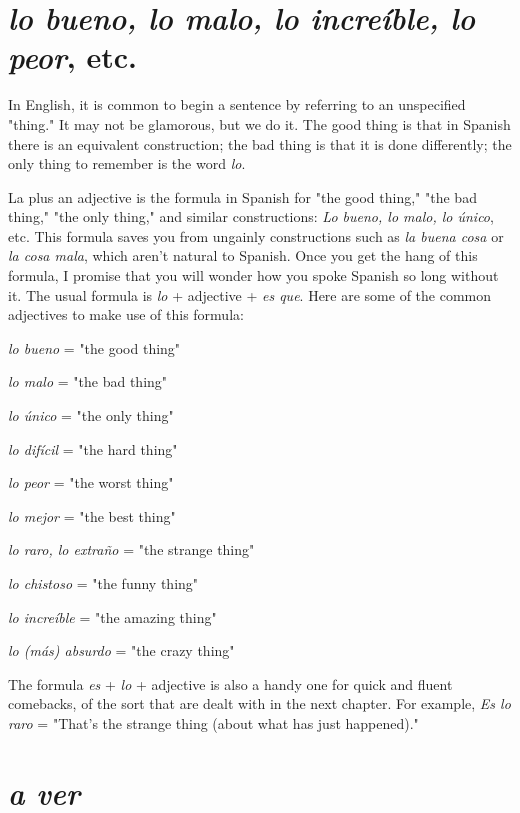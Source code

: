 \section{\emph{lo bueno, lo malo, lo increíble, lo peor}, etc.}

In English, it is common to begin a sentence by referring to an
unspecified "thing." It may not be glamorous, but we do it. The good
thing is that in Spanish there is an equivalent construction; the bad
thing is that it is done differently; the only thing to remember is the
word \emph{lo}.

La plus an adjective is the formula in Spanish for "the good
thing," "the bad thing," "the only thing," and similar constructions:
\emph{Lo bueno, lo malo, lo único}, etc. This formula saves you from ungainly constructions such as \emph{la buena cosa} or \emph{la cosa mala}, which
aren't natural to Spanish. Once you get the hang of this formula, I
promise that you will wonder how you spoke Spanish so long without
it. The usual formula is \emph{lo} + adjective + \emph{es que}. Here are some of the
common adjectives to make use of this formula:

\bsk

\indu \emph{lo bueno} = "the good thing"

\indu \emph{lo malo} = "the bad thing"

\indu \emph{lo único} = "the only thing"

\indu \emph{lo difícil} = "the hard thing"

\indu \emph{lo peor} = "the worst thing"

\indu \emph{lo mejor} = "the best thing"

\indu \emph{lo raro, lo extraño} = "the strange thing"

\indu \emph{lo chistoso} = "the funny thing"

\indu \emph{lo increíble} = "the amazing thing"

\indu \emph{lo (más) absurdo} = "the crazy thing"

\bsk

The formula \emph{es} + \emph{lo} + adjective is also a handy one for quick and
fluent comebacks, of the sort that are dealt with in the next chapter.
For example, \emph{Es lo raro} = "That's the strange thing (about what has
just happened)."

\section{\emph{a ver}}

